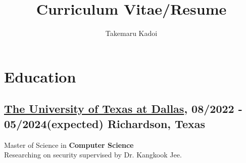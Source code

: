 \documentclass[10pt]{article}
\title{\vspace{-1cm}Curriculum Vitae/Resume}
\author{Takemaru Kadoi}
\date{}
\begin{document}
\section*{Education}
  \subsection*{\underline{The University of Texas at Dallas}, 08/2022 - 05/2024(expected) \hfill Richardson, Texas}
    Master of Science in \textbf{Computer Science}
    \\
    Researching on security supervised by Dr. Kangkook Jee.
\end{document}
